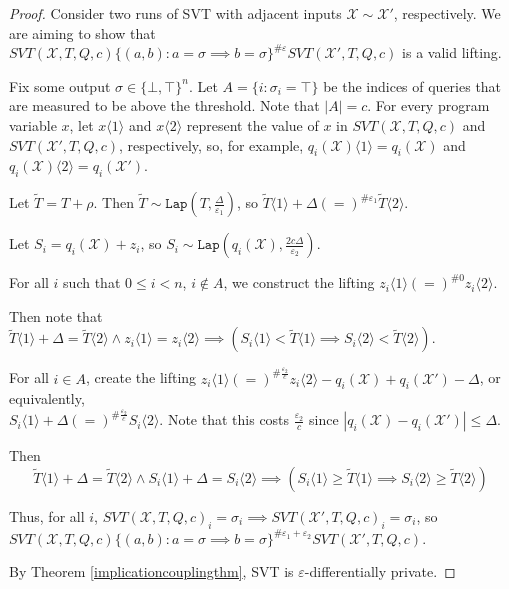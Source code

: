 \documentclass[12pt]{article}
\newcommand{\brangle}[1]{\langle #1 \rangle}
\newcommand{\Lap}{\texttt{Lap}}
\theoremstyle{definition}
\begin{document}
\begin{proof}
    Consider two runs of SVT with adjacent inputs $\mathcal{X}\sim\mathcal{X}'$, respectively. We are aiming to show that $SVT(\mathcal{X}, T, Q, c)\{(a, b): a=\sigma \implies b=\sigma\}^{\#\varepsilon}SVT(\mathcal{X}', T, Q, c)$ is a valid lifting. 

    Fix some output $\sigma \in \{\bot, \top\}^n$. Let $A = \{i:\sigma_i = \top\}$ be the indices of queries that are measured to be above the threshold. Note that $|A| = c$. For every program variable $x$, let $x\brangle{1}$ and $x\brangle{2}$ represent the value of $x$ in $SVT(\mathcal{X}, T, Q, c)$ and $SVT(\mathcal{X}', T, Q, c)$, respectively, so, for example, $q_i(\mathcal{X})\brangle{1} = q_i(\mathcal{X})$ and $q_i(\mathcal{X})\brangle{2} = q_i(\mathcal{X}')$. 

    Let $\tilde{T}=T + \rho$. Then $\tilde{T} \sim \Lap(T, \frac{\Delta}{\varepsilon_1})$, so $\tilde{T}\brangle{1} +\Delta (=)^{\#\varepsilon_1}\tilde{T}\brangle{2}$. 

    Let $S_i = q_i(\mathcal{X}) + z_i$, so $S_i \sim\Lap(q_i(\mathcal{X}), \frac{2c\Delta}{\varepsilon_2})$.

    For all $i$ such that $0\leq i < n$, $i\notin A$, we construct the lifting $z_i\langle 1\rangle (=)^{\#0}z_i\langle 2\rangle$. 

    Then note that $\tilde{T}\brangle{1}+\Delta = \tilde{T}\brangle{2}\land z_i\brangle{1} = z_i \brangle{2} \implies (S_i\brangle{1} < \tilde{T}\brangle{1} \implies S_i\brangle{2} < \tilde{T}\brangle{2} )$.

    For all $i\in A$, create the lifting $z_i\brangle{1}(=)^{\#\frac{\varepsilon_2}{c}}z_i\brangle{2} - q_i(\mathcal{X})+q_i(\mathcal{X}')-\Delta$, or equivalently, \\$S_i\brangle{1} +\Delta (=)^{\#\frac{\varepsilon_2}{c}} S_i\brangle{2}$. Note that this costs $\frac{\varepsilon_2}{c}$ since $|q_i(\mathcal{X})-q_i(\mathcal{X}')|\leq \Delta$.

    Then \[\tilde{T}\brangle{1} +\Delta = \tilde{T}\brangle{2} \land S_i\brangle{1} + \Delta = S_i\brangle{2} \implies (S_i\brangle{1} \geq \tilde{T}\brangle{1} \implies S_i\langle 2\rangle \geq \tilde{T}\brangle{2})\]

    Thus, for all $i$, $SVT(\mathcal{X}, T, Q, c)_i = \sigma_i \implies SVT(\mathcal{X}', T, Q, c)_i = \sigma_i$, so $SVT(\mathcal{X}, T, Q, c)\{(a, b): a=\sigma \implies b=\sigma\}^{\#\varepsilon_1+\varepsilon_2}SVT(\mathcal{X}', T, Q, c)$.

    By Theorem \ref{implicationcouplingthm}, SVT is $\varepsilon$-differentially private. 
\end{proof}
\end{document}
